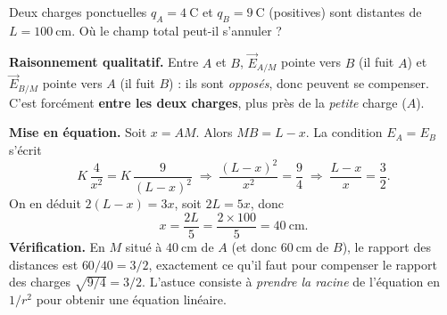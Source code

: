 \documentclass[11pt,a4paper]{article}
\newcommand{\vc}[1]{\vec{#1}}
\newcommand{\E}[2]{\vc{E}_{#1/#2}}     %
\begin{document}
\begin{exemple}
Deux charges ponctuelles $q_A = \SI{4}{\coulomb}$ et $q_B = \SI{9}{\coulomb}$ (positives) sont
distantes de $L = \SI{100}{\centi\metre}$. Où le champ total peut-il s'annuler ?

\textbf{Raisonnement qualitatif.} Entre $A$ et $B$, $\E{A}{M}$ pointe vers $B$ (il fuit $A$) et
$\E{B}{M}$ pointe vers $A$ (il fuit $B$) : ils sont \emph{opposés}, donc peuvent se compenser.
C'est forcément \textbf{entre les deux charges}, plus près de la \emph{petite} charge ($A$).

\textbf{Mise en équation.} Soit $x = AM$. Alors $MB = L-x$. La condition $E_A = E_B$ s'écrit
\[ K\,\frac{4}{x^{2}} = K\,\frac{9}{(L-x)^{2}}
   \;\Longrightarrow\; \frac{(L-x)^{2}}{x^{2}} = \frac{9}{4}
   \;\Longrightarrow\; \frac{L-x}{x} = \frac{3}{2}. \]
On en déduit $2(L-x) = 3x$, soit $2L = 5x$, donc
\[ x = \frac{2L}{5} = \frac{2\times 100}{5} = \SI{40}{\centi\metre}. \]
\textbf{Vérification.} En $M$ situé à $\SI{40}{\centi\metre}$ de $A$ (et donc
$\SI{60}{\centi\metre}$ de $B$), le rapport des distances est $60/40 = 3/2$, exactement ce qu'il
faut pour compenser le rapport des charges $\sqrt{9/4}=3/2$. L'astuce consiste à \emph{prendre la
racine} de l'équation en $1/r^{2}$ pour obtenir une équation linéaire.
\end{exemple}
\end{document}
